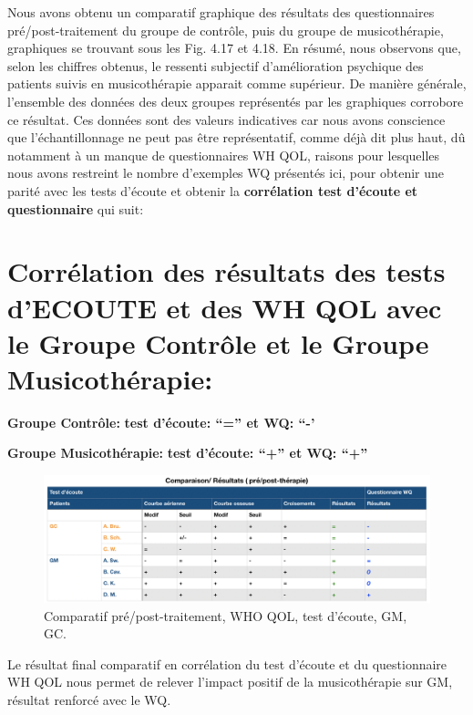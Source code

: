 Nous avons obtenu un comparatif graphique  des résultats des questionnaires
pré/post-traitement du groupe de contrôle, puis du groupe de musicothérapie,
graphiques se trouvant sous les Fig. 4.17 et 4.18.
       En résumé, nous observons que, selon les chiffres obtenus, le ressenti
       subjectif d'amélioration psychique
        des patients suivis en musicothérapie apparait comme
        supérieur.
        De manière générale, l'ensemble des données des deux groupes représentés
        par les graphiques corrobore ce résultat.
        Ces données sont des valeurs indicatives car nous avons conscience que l'échantillonnage ne
        peut pas être représentatif, comme déjà dit plus haut, dû
        notamment à un
        manque de
        questionnaires WH QOL, raisons pour lesquelles nous avons
        restreint le nombre d'exemples WQ présentés ici, pour obtenir
        une parité avec les tests d'écoute et obtenir la
        \textbf{corrélation test d'écoute et questionnaire} qui
        suit:

  \section{Corrélation des résultats des tests d'ECOUTE et des WH QOL avec le Groupe Contrôle et le
    Groupe Musicothérapie:}
\textbf{Groupe Contrôle:} 	          \textbf{ test d'écoute: ``=''   et    WQ: ``-'}


\textbf{Groupe Musicothérapie:}     \textbf{test d'écoute: ``+''      et    WQ: ``+''}


\begin{figure}
\centering
\includegraphics[width=\linewidth]{images/graphiques/comparaison_pre_post.png}
\caption[Corrélation résultats pré/post]{Comparatif
  pré/post-traitement, WHO QOL, test d'écoute, GM, GC.}

\label{comparaison_pre_post}
\end{figure}


Le résultat final comparatif en corrélation du test d'écoute et du questionnaire WH QOL nous permet
                de relever l'impact positif de la
                musicothérapie sur GM, résultat renforcé
                avec le WQ.


